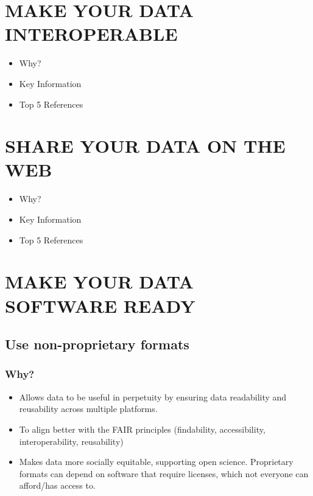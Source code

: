 \documentclass[
  oneside]{book}
\providecommand{\tightlist}{%
  \setlength{\itemsep}{0pt}\setlength{\parskip}{0pt}}
\begin{document}
\hypertarget{make-your-data-interoperable}{%
\chapter{MAKE YOUR DATA INTEROPERABLE}\label{make-your-data-interoperable}}

\begin{itemize}
\tightlist
\item
  Why?
\item
  Key Information
\item
  Top 5 References
\end{itemize}

\hypertarget{share-your-data-on-the-web}{%
\chapter{SHARE YOUR DATA ON THE WEB}\label{share-your-data-on-the-web}}

\begin{itemize}
\tightlist
\item
  Why?
\item
  Key Information
\item
  Top 5 References
\end{itemize}

\hypertarget{make-your-data-software-ready}{%
\chapter{MAKE YOUR DATA SOFTWARE READY}\label{make-your-data-software-ready}}

\hypertarget{use-non-proprietary-formats}{%
\section{Use non-proprietary formats}\label{use-non-proprietary-formats}}

\hypertarget{why}{%
\subsection{Why?}\label{why}}

\begin{itemize}
\tightlist
\item
  Allows data to be useful in perpetuity by ensuring data readability and reusability across multiple platforms.
\item
  To align better with the FAIR principles (findability, accessibility, interoperability, reusability)
\item
  Makes data more socially equitable, supporting open science. Proprietary formats can depend on software that require licenses, which not everyone can afford/has access to.
\end{itemize}
\end{document}
